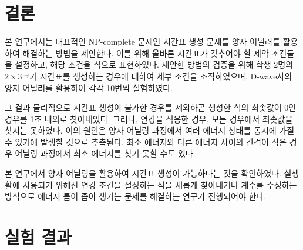 \documentclass{article}
\begin{document}
    \section{결론}

본 연구에서는 대표적인 NP-complete 문제인 시간표 생성 문제를 양자 어닐러를 활용하여 해결하는 방법을 제안한다. 이를 위해 올바른 시간표가 갖추어야 할 제약 조건들을 설정하고, 해당 조건을 식으로 표현하였다. 제안한 방법의 검증을 위해 학생 2명의 $2\times3$크기 시간표를 생성하는 경우에 대하여 세부 조건을 조작하였으며, D-wave사의 양자 어닐러를 활용하여 각각 10번씩 실험하였다.

그 결과 물리적으로 시간표 생성이 불가한 경우를 제외하곤 생성한 식의 최솟값이 0인 경우를 1초 내외로 찾아내었다. 그러나, 연강을 적용한 경우, 모든 경우에서 최솟값을 찾지는 못하였다. 이의 원인은 양자 어닐링 과정에서 여러 에너지 상태를 동시에 가질 수 있기에 발생할 것으로 추측된다. 최소 에너지와 다른 에너지 사이의 간격이 작은 경우 어닐링 과정에서 최소 에너지를 찾기 못할 수도 있다.

본 연구에서 양자 어닐링을 활용하여 시간표 생성이 가능하다는 것을 확인하였다. 실생활에 사용되기 위해선 연강 조건을 설정하는 식을 새롭게 찾아내거나 계수를 수정하는 방식으로 에너지 틈이 좁아 생기는 문제를 해결하는 연구가 진행되어야 한다.

    \newpage
    
    
    
    \newpage

    \appendix
    \section{실험 결과}\label{results}
\end{document}
